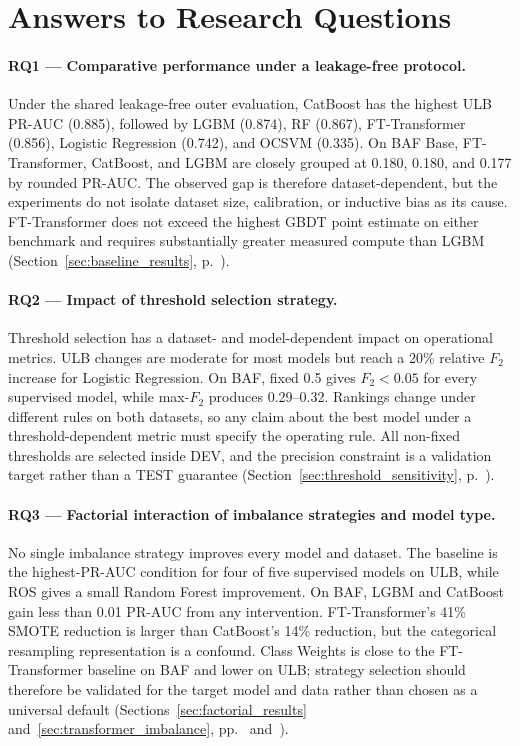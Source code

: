 \section{Answers to Research Questions}
\label{sec:rq_answers}

\paragraph{RQ1 — Comparative performance under a leakage-free protocol.}
Under the shared leakage-free outer evaluation, CatBoost has the highest ULB PR-AUC (0.885), followed by LGBM (0.874), RF (0.867), FT-Transformer (0.856), Logistic Regression (0.742), and OCSVM (0.335). On BAF Base, FT-Transformer, CatBoost, and LGBM are closely grouped at 0.180, 0.180, and 0.177 by rounded PR-AUC. The observed gap is therefore dataset-dependent, but the experiments do not isolate dataset size, calibration, or inductive bias as its cause. FT-Transformer does not exceed the highest GBDT point estimate on either benchmark and requires substantially greater measured compute than LGBM (Section~\ref{sec:baseline_results}, p.~\pageref{sec:baseline_results}).

\paragraph{RQ2 — Impact of threshold selection strategy.}
Threshold selection has a dataset- and model-dependent impact on operational metrics. ULB changes are moderate for most models but reach a 20\% relative $F_2$ increase for Logistic Regression. On BAF, fixed 0.5 gives $F_2<0.05$ for every supervised model, while max-$F_2$ produces 0.29--0.32. Rankings change under different rules on both datasets, so any claim about the best model under a threshold-dependent metric must specify the operating rule. All non-fixed thresholds are selected inside DEV, and the precision constraint is a validation target rather than a TEST guarantee (Section~\ref{sec:threshold_sensitivity}, p.~\pageref{sec:threshold_sensitivity}).

\paragraph{RQ3 — Factorial interaction of imbalance strategies and model type.}
No single imbalance strategy improves every model and dataset. The baseline is the highest-PR-AUC condition for four of five supervised models on ULB, while ROS gives a small Random Forest improvement. On BAF, LGBM and CatBoost gain less than 0.01 PR-AUC from any intervention. FT-Transformer's 41\% SMOTE reduction is larger than CatBoost's 14\% reduction, but the categorical resampling representation is a confound. Class Weights is close to the FT-Transformer baseline on BAF and lower on ULB; strategy selection should therefore be validated for the target model and data rather than chosen as a universal default (Sections~\ref{sec:factorial_results} and~\ref{sec:transformer_imbalance}, pp.~\pageref{sec:factorial_results} and~\pageref{sec:transformer_imbalance}).

